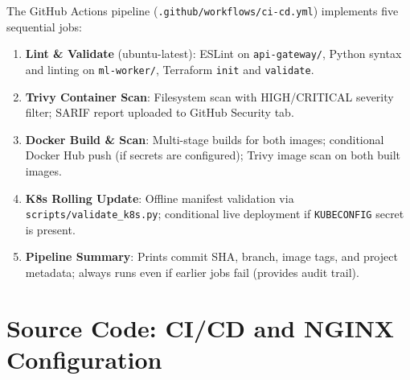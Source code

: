 \documentclass[12pt,a4paper]{report}
\begin{document}
The GitHub Actions pipeline (\texttt{.github/workflows/ci-cd.yml}) implements
five sequential jobs:

\begin{enumerate}[leftmargin=1.5cm]
  \item \textbf{Lint \& Validate} (ubuntu-latest): ESLint on
        \texttt{api-gateway/}, Python syntax and linting on
        \texttt{ml-worker/}, Terraform \texttt{init} and \texttt{validate}.
  \item \textbf{Trivy Container Scan}: Filesystem scan with HIGH/CRITICAL
        severity filter; SARIF report uploaded to GitHub Security tab.
  \item \textbf{Docker Build \& Scan}: Multi-stage builds for both images;
        conditional Docker Hub push (if secrets are configured); Trivy image
        scan on both built images.
  \item \textbf{K8s Rolling Update}: Offline manifest validation via
        \texttt{scripts/validate\_k8s.py}; conditional live deployment if
        \texttt{KUBECONFIG} secret is present.
  \item \textbf{Pipeline Summary}: Prints commit SHA, branch, image tags, and
        project metadata; always runs even if earlier jobs fail (provides
        audit trail).
\end{enumerate}

\section{Source Code: CI/CD and NGINX Configuration}
\end{document}
